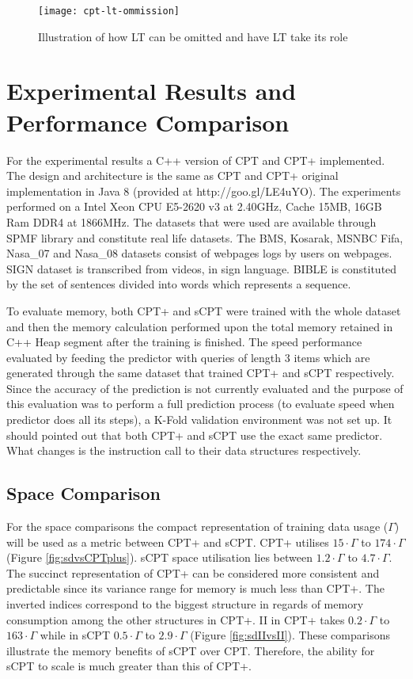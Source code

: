 \begin{figure}[h]
    \centering
    \texttt{[image: cpt-lt-ommission]}
    \caption{Illustration of how LT can be omitted and have LT take its role}
    \label{fig:LT-ommission}
\end{figure}

\section{Experimental Results and Performance Comparison} \label{experimental}
For the experimental results a C++ version of CPT and CPT+ implemented. The design and architecture is the same as CPT and CPT+ original implementation in Java 8 (provided at http://goo.gl/LE4uYO). The experiments performed on a Intel Xeon CPU E5-2620 v3 at 2.40GHz, Cache 15MB, 16GB Ram DDR4 at 1866MHz. The datasets that were used are available through SPMF library \cite{spmf} and constitute real life datasets. The BMS, Kosarak, MSNBC Fifa, Nasa\_07 and Nasa\_08 datasets consist of webpages logs by users on webpages. SIGN dataset is transcribed from videos, in sign language. BIBLE is constituted by the set of sentences divided into words which represents a sequence. 
\par To evaluate memory, both CPT+ and sCPT were trained with the whole dataset and then the memory calculation performed upon the total memory retained in C++ Heap segment after the training is finished. The speed performance evaluated by feeding the predictor with queries of length 3 items which are generated through the same dataset that trained CPT+ and sCPT respectively. Since the accuracy of the prediction is not currently evaluated and the purpose of this evaluation was to perform a full prediction process (to evaluate speed when predictor does all its steps), a K-Fold \cite{Kohavi} validation environment was not set up. It should pointed out that both CPT+ and sCPT use the exact same predictor. What changes is the instruction call to their data structures respectively.

\subsection*{Space Comparison}
For the space comparisons the compact representation of training data usage ($\Gamma$) will be used as a metric between CPT+ and sCPT. CPT+ utilises $15 \cdot \Gamma$ to $174 \cdot \Gamma$ (Figure \ref{fig:sdvsCPTplus}). sCPT space utilisation lies between $1.2 \cdot \Gamma$ to $4.7 \cdot \Gamma$. The succinct representation of CPT+ can be considered more consistent and predictable since its variance range for memory is much less than CPT+. The inverted indices correspond to the biggest structure in regards of memory consumption among the other structures in CPT+. II in CPT+ takes $0.2 \cdot \Gamma$ to $163 \cdot \Gamma$ while in sCPT $0.5 \cdot \Gamma$ to $2.9 \cdot \Gamma$ (Figure \ref{fig:sdIIvsII}). These comparisons illustrate the memory benefits of sCPT over CPT. Therefore, the ability for sCPT to scale is much greater than this of CPT+.
